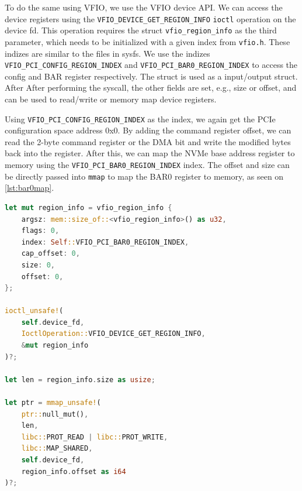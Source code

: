 To do the same using VFIO, we use the VFIO device API.
We can access the device registers using the \texttt{VFIO\_DEVICE\_GET\_REGION\_INFO} \texttt{ioctl} operation on the device fd. This operation requires the struct \texttt{vfio\_region\_info} as the third parameter, which needs to be initialized with a given index from \texttt{vfio.h}.
These indizes are similar to the files in sysfs. We use the indizes \texttt{VFIO\_PCI\_CONFIG\_REGION\_INDEX} and \texttt{VFIO\_PCI\_BAR0\_REGION\_INDEX} to access the config and BAR register respectively. The struct is used as a input/output struct. After
After performing the syscall, the other fields are set, e.g., size or offset, and can be used to read/write or memory map device registers.

Using \texttt{VFIO\_PCI\_CONFIG\_REGION\_INDEX} as the index, we again get the PCIe configuration space address 0x0. By adding the command register offset, we can read the 2-byte command register or the DMA bit and write the modified bytes back into the register.
After this, we can map the NVMe base address register to memory using the \texttt{VFIO\_PCI\_BAR0\_REGION\_INDEX} index.
The offset and size can be directly passed into \texttt{mmap} to map the BAR0 register to memory, as seen on \autoref{lst:bar0map}.

\begin{minipage}{.95\linewidth}
    \begin{lstlisting}[language=Rust,caption={Mapping the BAR0 NVMe register to memory}, label=lst:bar0map]
let mut region_info = vfio_region_info {
    argsz: mem::size_of::<vfio_region_info>() as u32,
    flags: 0,
    index: Self::VFIO_PCI_BAR0_REGION_INDEX,
    cap_offset: 0,
    size: 0,
    offset: 0,
};

ioctl_unsafe!(
    self.device_fd,
    IoctlOperation::VFIO_DEVICE_GET_REGION_INFO,
    &mut region_info
)?;

let len = region_info.size as usize;

let ptr = mmap_unsafe!(
    ptr::null_mut(),
    len,
    libc::PROT_READ | libc::PROT_WRITE,
    libc::MAP_SHARED,
    self.device_fd,
    region_info.offset as i64
)?; 
\end{lstlisting}
\end{minipage}

